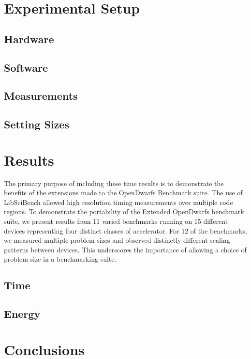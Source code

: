 \documentclass[sigconf,preprint,9pt]{acmart}
\begin{document}
\section{Experimental Setup}\label{sec:experimental_setup}
\subsection{Hardware}
\subsection{Software}
\subsection{Measurements}
\subsection{Setting Sizes}


\section{Results}\label{sec:results}

The primary purpose of including these time results is to demonstrate the benefits of the extensions made to the OpenDwarfs Benchmark suite.
The use of LibSciBench allowed high resolution timing measurements over multiple code regions.
To demonstrate the portability of the Extended OpenDwarfs benchmark suite, we present results from 11 varied benchmarks running on 15 different devices representing four distinct classes of accelerator.
For 12 of the benchmarks, we measured multiple problem sizes and observed distinctly different scaling patterns between devices.
This underscores the importance of allowing a choice of problem size in a benchmarking suite.

\subsection{Time}
\subsection{Energy}


\section{Conclusions}
\end{document}
